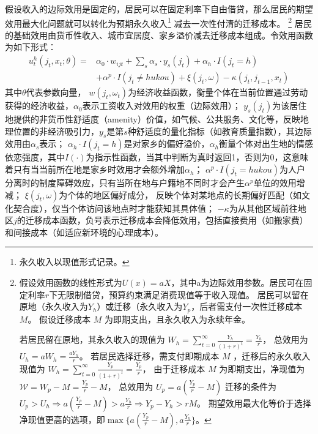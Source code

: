 \documentclass[a4paper,12pt,oneside]{book} %
\begin{document}
假设收入的边际效用是固定的，居民可以在固定利率下自由借贷，那么居民的期望效用最大化问题就可以转化为预期永久收入\footnote{永久收入以现值形式记录。}
减去一次性付清的迁移成本。
\footnote{
假设效用函数的线性形式为$U(x)=a X$，其中a为边际效用参数。居民可在固定利率$r$下无限制借贷，预算约束满足消费现值等于收入现值。
居民可以留在原地（永久收入为$Y_h$）或迁移（永久收入为$Y_p$，后者需支付一次性迁移成本 $M$。
假设迁移成本 
$M$
为即期支出，且永久收入为永续年金。

若居民留在原地，其永久收入的现值为
$W_h = \sum\limits_{t=0}^\infty \frac{Y_h}{(1+r)^t}=\frac{Y_h}{r}$，
总效用为$U_h=a W_h = \frac{a Y_h}{r}$。
若居民选择迁移，需支付即期成本 
$M$
，迁移后的永久收入现值为
$W_h = \sum\limits_{t=0}^\infty \frac{Y_p}{(1+r)^t}=\frac{Y_p}{r}$，
由于迁移成本 
$M$
为即期支出，净现值为
$\mathcal{W}=W_p-M=\frac{Y_p}{r}-M$，
总效用为
$U_p=a(\frac{Y_p}{r}-M)$
迁移的条件为$U_p>U_h \Rightarrow a(\frac{Y_p}{r}-M) > a \frac{ Y_h}{r} \Rightarrow Y_p-Y_h > rM$。
期望效用最大化等价于选择净现值更高的选项，即$\max\{a(\frac{Y_p}{r}-M), a \frac{ Y_h}{r}\}$。
}
居民的基础效用由货币性收入、城市宜居度、家乡溢价减去迁移成本组成。令效用函数为如下形式：
\begin{equation}
  \begin{split}
    u_t^h(j_t,x_t;\theta)=&\alpha_0 \cdot w_{ijt}+\sum\limits_{s} \alpha_{s} \cdot y_{s}(j_t)  + \alpha_h \cdot I(j_t=h) 
    \\& + \alpha^p \cdot I(j_t \neq hukou) +\xi(j_t,\omega)-\kappa(j_t,j_{t-1},x_t)
  \end{split}
  \label{eq:家乡效用函数中的具体构成}
\end{equation}
其中$\theta$代表参数向量， $w(j_t,\omega_t)$为经济收益函数，衡量个体在当前位置通过劳动获得的经济收益，$\alpha_0$表示工资收入对效用的权重（边际效用）；
$y_{s}(j_t)$为该居住地提供的非货币性舒适度（amenity）价值，如气候、公共服务、文化等，反映地理位置的非经济吸引力，$y_s$是第$s$种舒适度的量化指标（如教育质量指数），其边际效用由$\alpha_s$表示；
$\alpha_h \cdot I(j_t=h)$是对家乡的偏好溢价，$\alpha_h$衡量个体对出生地的情感依恋强度，其中$I(\cdot)$为指示性函数，当其中判断为真时返回1，否则为0，这意味着只有当当前所在地是家乡时效用才会额外增加$\alpha_h$；
$\alpha^p \cdot I(j_t = hukou)$为人户分离时的制度障碍效应，只有当所在地与户籍地不同时才会产生$\alpha^p$单位的效用增减；
$\xi(j_t,\omega)$为个体的地区偏好成分，
反映个体对某地点的长期偏好匹配（如文化契合度），仅当个体访问该地点时才能获知其具体值；
$-\kappa$为从其他区域前往地区$j$的迁移成本函数，负号表示迁移成本会降低效用，包括直接费用（如搬家费）和间接成本（如适应新环境的心理成本）。
\end{document}
